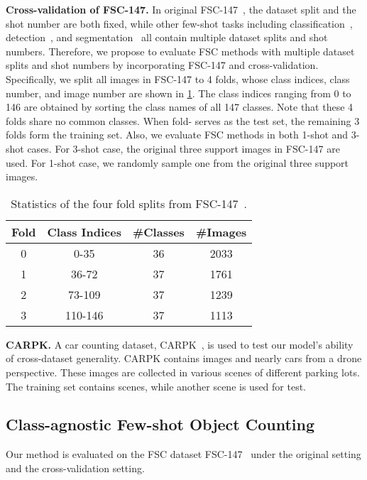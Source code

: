 \documentclass[10pt,twocolumn,letterpaper]{article}
\begin{document}
\vspace{2pt}\noindent \textbf{Cross-validation of FSC-147.}  
In original FSC-147~\cite{famnet}, the dataset split and the shot number are both fixed, while other few-shot tasks including classification~\cite{wertheimer2021few}, detection~\cite{fan2020few}, and segmentation~\cite{yang2021mining} all contain multiple dataset splits and shot numbers. 
Therefore, we propose to evaluate FSC methods with multiple dataset splits and shot numbers by incorporating FSC-147 and cross-validation. 
Specifically, we split all images in FSC-147 to 4 folds, whose class indices, class number, and image number are shown in \cref{tab:fold}. 
The class indices ranging from 0 to 146 are obtained by sorting the class names of all 147 classes.
Note that these 4 folds share no common classes. 
When fold-  serves as the test set, the remaining 3 folds form the training set. 
Also, we evaluate FSC methods in both 1-shot and 3-shot cases. 
For 3-shot case, the original three support images in FSC-147 are used. 
For 1-shot case, we randomly sample one from the original three support images. 


\begin{table}[t]
\setlength\tabcolsep{5pt}
\centering
\scriptsize
\caption{Statistics of the four fold splits from FSC-147~\cite{famnet}.}
\begin{tabular}{cccc}
\toprule
Fold & Class Indices & \#Classes & \#Images  \\
\midrule
0 & 0-35         & 36 & 2033 \\
1 & 36-72        & 37 & 1761 \\
2 & 73-109       & 37 & 1239 \\
3 & 110-146      & 37 & 1113 \\
\bottomrule
\end{tabular}
\label{tab:fold}
\vspace{-10pt}
\end{table}


\vspace{2pt}\noindent \textbf{CARPK.} A car counting dataset, CARPK~\cite{lpn}, is used to test our model’s ability of cross-dataset generality. CARPK contains  images and nearly  cars from a drone perspective. These images are collected in various scenes of  different parking lots. The training set contains  scenes, while another scene is used for test. 


\subsection{Class-agnostic Few-shot Object Counting} \label{sec:fsc_147}
Our method is evaluated on the FSC dataset FSC-147~\cite{famnet} under the original setting and the cross-validation setting. 
\end{document}
